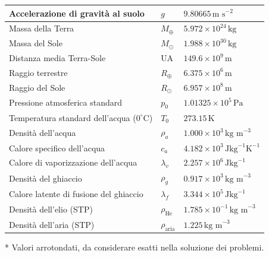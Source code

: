 \documentclass[a4paper,12pt]{article}
\begin{document}
\begin{center}
\begin{tabular}{|>{\centering\arraybackslash}m{}|>{\centering\arraybackslash}m{}|>{\centering\arraybackslash}m{5cm}|}
Accelerazione di gravità al suolo & $g$ & $9.80665 \, \text{m s}^{-2}$ \\ \hline
Massa della Terra & $M_\oplus$ & $5.972 \times 10^{24} \, \text{kg}$ \\ \hline
Massa del Sole & $M_\odot$ & $1.988 \times 10^{30} \, \text{kg}$ \\ \hline
Distanza media Terra-Sole & UA & $149.6 \times 10^9 \, \text{m}$ \\ \hline
Raggio terrestre & $R_\oplus$ & $6.375 \times 10^6 \, \text{m}$ \\ \hline
Raggio del Sole & $R_\odot$ & $6.957 \times 10^8 \, \text{m}$ \\ \hline
Pressione atmosferica standard & $p_0$ & $1.01325 \times 10^5 \, \text{Pa}$ \\ \hline
Temperatura standard dell'acqua ($0^\circ\text{C}$) & $T_0$ & $273.15 \, \text{K}$ \\ \hline
Densità dell’acqua & $\rho_a$ & $1.000 \times 10^3 \, \text{kg m}^{-3}$ \\ \hline
Calore specifico dell’acqua & $c_a$ & $4.182 \times 10^3 \, \text{Jkg}^{-1}\text{K}^{-1}$ \\ \hline
Calore di vaporizzazione dell’acqua & $\lambda_v$ & $2.257 \times 10^6 \, \text{Jkg}^{-1}$ \\ \hline
Densità del ghiaccio & $\rho_g$ & $0.917 \times 10^3 \, \text{kg m}^{-3}$ \\ \hline
Calore latente di fusione del ghiaccio & $\lambda_f$ & $3.344 \times 10^5 \,\text{Jkg}^{-1}$ \\ \hline
Densità dell'elio (STP) & $\rho_{\text{He}}$ & $1.785 \times 10^{-1} \,\text{kg m}^{-3}$ \\ \hline
Densità dell'aria (STP) & $\rho_{\text{aria}}$ & $1.225  \,\text{kg m}^{-3}$ \\ \hline
\end{tabular}
\end{center}

\centering
\small{* Valori arrotondati, da considerare esatti nella soluzione dei problemi.}
\end{document}
